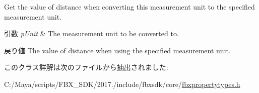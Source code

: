 Get the value of distance when converting this measurement unit to the specified measurement unit. 
\begin{DoxyParams}{引数}
{\em p\+Unit} & The measurement unit to be converted to. \\
\hline
\end{DoxyParams}
\begin{DoxyReturn}{戻り値}
The value of distance when using the specified measurement unit. 
\end{DoxyReturn}


このクラス詳解は次のファイルから抽出されました\+:\begin{DoxyCompactItemize}
\item 
C\+:/\+Maya/scripts/\+F\+B\+X\+\_\+\+S\+D\+K/2017./include/fbxsdk/core/\hyperlink{fbxpropertytypes_8h}{fbxpropertytypes.\+h}\end{DoxyCompactItemize}
